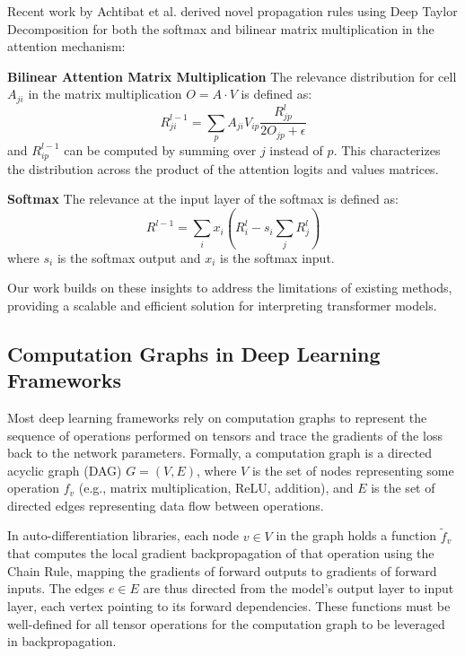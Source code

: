 \documentclass{article}
\begin{document}
Recent work by Achtibat et al. \cite{achtibat2024attnlrp} derived novel propagation rules using Deep Taylor Decomposition
for both the softmax and bilinear matrix multiplication in the attention mechanism:

\textbf{Bilinear Attention Matrix Multiplication} The relevance distribution for cell $A_{ji}$ in the matrix multiplication $O = A \cdot V$ is defined as:
\begin{equation}
  R_{ji}^{l - 1} = \sum_p A_{ji}V_{ip} \frac{R_{jp}^l}{2 O_{jp} + \epsilon}
\end{equation}
and $R_{ip}^{l - 1}$ can be computed by summing over $j$ instead of $p$. This characterizes the distribution across the
product of the attention logits and values matrices.

\textbf{Softmax} The relevance at the input layer of the softmax is defined as:
\begin{equation}
  R^{l - 1} = \sum_i x_i (R_i^l - s_i \sum_j R_j^l)
\end{equation}
where $s_i$ is the softmax output and $x_i$ is the softmax input.

Our work builds on these insights to address the limitations of existing methods, providing a scalable and efficient solution for interpreting transformer models.

\subsection{Computation Graphs in Deep Learning Frameworks}

Most deep learning frameworks rely on computation graphs to represent the sequence of operations performed on tensors and trace the gradients of the loss back to the network parameters.
Formally, a computation graph is a directed acyclic graph (DAG) $G = (V, E)$, where $V$ is the set of nodes representing some operation $f_v$ (e.g., matrix multiplication, ReLU, addition), and $E$ is the set of directed edges representing data flow between operations.

In auto-differentiation libraries, each node $v \in V$ in the graph holds a function $\tilde{f}_v$ that computes the local gradient backpropagation of that operation using the Chain Rule, mapping the gradients of forward outputs to gradients of forward inputs.
The edges $e \in E$ are thus directed from the model's output layer to input layer, each vertex pointing to its forward dependencies.
These functions must be well-defined for all tensor operations for the computation graph to be leveraged in backpropagation.
\end{document}
